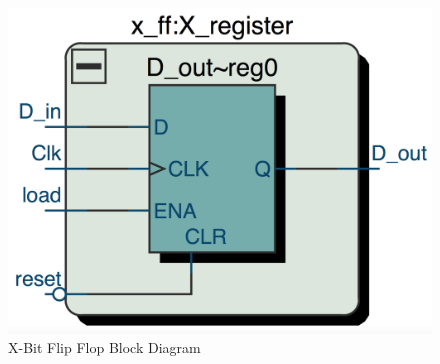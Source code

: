\documentclass[journal, twocolumn, final,11pt,letterpaper]{IEEEtran}
\begin{document}
\begin{figure} [htbp]
	\centering
	\includegraphics[scale=0.4]{x-ff-diagram.png}
	\caption{X-Bit Flip Flop Block Diagram\label{fig:x-ff-diagram}}
\end{figure}





\end{document}
